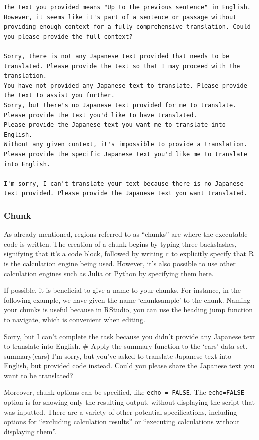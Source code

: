 \documentclass[
  a4paper,
]{book}
\begin{document}
\begin{verbatim}
The text you provided means "Up to the previous sentence" in English. However, it seems like it's part of a sentence or passage without providing enough context for a fully comprehensive translation. Could you please provide the full context?

Sorry, there is not any Japanese text provided that needs to be translated. Please provide the text so that I may proceed with the translation.
You have not provided any Japanese text to translate. Please provide the text to assist you further.
Sorry, but there's no Japanese text provided for me to translate. Please provide the text you'd like to have translated.
Please provide the Japanese text you want me to translate into English.
Without any given context, it's impossible to provide a translation. Please provide the specific Japanese text you'd like me to translate into English.

I'm sorry, I can't translate your text because there is no Japanese text provided. Please provide the Japanese text you want translated.
\end{verbatim}

\subsubsection{Chunk}\label{chunk}

As already mentioned, regions referred to as ``chunks'' are where the
executable code is written. The creation of a chunk begins by typing
three backslashes, signifying that it's a code block, followed by
writing \texttt{r} to explicitly specify that R is the calculation
engine being used. However, it's also possible to use other calculation
engines such as Julia or Python by specifying them here.

If possible, it is beneficial to give a name to your chunks. For
instance, in the following example, we have given the name `chunksample'
to the chunk. Naming your chunks is useful because in RStudio, you can
use the heading jump function to navigate, which is convenient when
editing.

Sorry, but I can't complete the task because you didn't provide any
Japanese text to translate into English. \# Apply the summary function
to the `cars' data set. summary(cars) I'm sorry, but you've asked to
translate Japanese text into English, but provided code instead. Could
you please share the Japanese text you want to be translated?

Moreover, chunk options can be specified, like \texttt{echo\ =\ FALSE}.
The \texttt{echo=FALSE} option is for showing only the resulting output,
without displaying the script that was inputted. There are a variety of
other potential specifications, including options for ``excluding
calculation results'' or ``executing calculations without displaying
them''.
\end{document}
